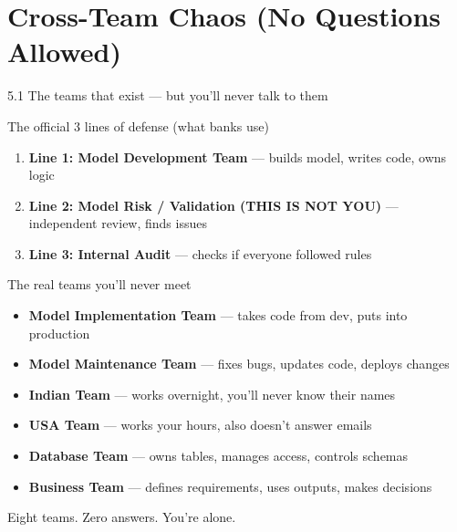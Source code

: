 \documentclass[aspectratio=169, 11pt]{beamer}
\begin{document}
\section{Cross-Team Chaos (No Questions Allowed)}

\begin{frame}{5.1 The teams that exist — but you'll never talk to them}
	\begin{block}{The official 3 lines of defense (what banks use)}
		\scriptsize
		\begin{enumerate}
			\item \textbf{Line 1: Model Development Team} — builds model, writes code, owns logic
			\item \textbf{Line 2: Model Risk / Validation (THIS IS NOT YOU)} — independent review, finds issues
			\item \textbf{Line 3: Internal Audit} — checks if everyone followed rules
		\end{enumerate}
	\end{block}
	
	\vspace{0.05cm}
	
	\begin{block}{The real teams you'll never meet}
		\scriptsize
		\begin{itemize}
			\item \textbf{Model Implementation Team} — takes code from dev, puts into production
			\item \textbf{Model Maintenance Team} — fixes bugs, updates code, deploys changes
			\item \textbf{Indian Team} — works overnight, you'll never know their names
			\item \textbf{USA Team} — works your hours, also doesn't answer emails
			\item \textbf{Database Team} — owns tables, manages access, controls schemas
			\item \textbf{Business Team} — defines requirements, uses outputs, makes decisions
		\end{itemize}
	\end{block}
	
	\vspace{0.05cm}
	\tiny\alert{Eight teams. Zero answers. You're alone.}
\end{frame}
\end{document}
